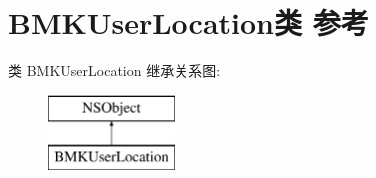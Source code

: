 \hypertarget{interface_b_m_k_user_location}{\section{B\+M\+K\+User\+Location类 参考}
\label{interface_b_m_k_user_location}
}
类 B\+M\+K\+User\+Location 继承关系图\+:\begin{figure}[H]
\begin{center}
\leavevmode
\includegraphics[height=2.000000cm]{interface_b_m_k_user_location}
\end{center}
\end{figure}
